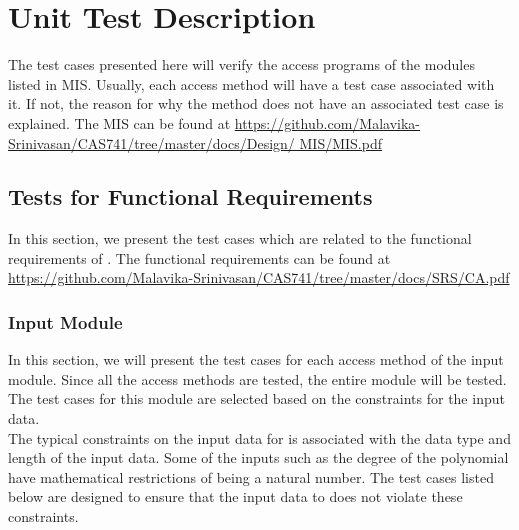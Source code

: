 \documentclass[12pt, titlepage]{article}
\begin{document}

\section{Unit Test Description}

The test cases presented here will verify the access programs of the modules 
listed in MIS. Usually, each access method will have a test case associated 
with it. If not, the reason for why the method does not have an associated test 
case is explained. The MIS can be found at 
\url{https://github.com/Malavika-Srinivasan/CAS741/tree/master/docs/Design/
	MIS/MIS.pdf}

\subsection{Tests for Functional Requirements}

In this section, we present the test cases which are related to the functional 
requirements of \famname{}. The functional requirements can be found at 
\url{https://github.com/Malavika-Srinivasan/CAS741/tree/master/docs/SRS/CA.pdf}
 

\subsubsection {Input Module}

In this section, we will present the test cases for each access method of the 
input module. Since all the access methods are tested, the entire module will 
be tested. The test cases for this module are selected based on the constraints 
for the input data. \\
The typical constraints on the input data for \famname{} is associated with the 
data type and length of the input data. Some of the inputs such as the degree 
of the polynomial have mathematical restrictions of being a natural number. The 
test cases listed below are designed to ensure that the input data to 
\famname{} does not violate these constraints.  
\end{document}
